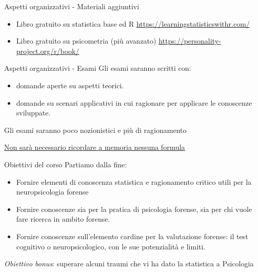 \documentclass[
  ignorenonframetext,
]{beamer}
\providecommand{\tightlist}{%
  \setlength{\itemsep}{0pt}\setlength{\parskip}{0pt}}
\begin{document}
\begin{frame}{Aspetti organizzativi - Materiali aggiuntivi}
\label{aspetti-organizzativi---materiali-aggiuntivi}
\begin{itemize}[<+->]
\item
  Libro gratuito su statistica base ed R
  \url{https://learningstatisticswithr.com/}
\item
  Libro gratuito su psicometria (più avanzato)
  \url{https://personality-project.org/r/book/}
\end{itemize}
\end{frame}

\begin{frame}{Aspetti organizzativi - Esami}
\label{aspetti-organizzativi---esami}
Gli esami saranno scritti con:

\begin{itemize}[<+->]
\tightlist
\item
  domande aperte su aspetti teorici.
\item
  domande su scenari applicativi in cui ragionare per applicare le
  conoscenze sviluppate.
\end{itemize}

Gli esami saranno poco nozionistici e più di ragionamento

\underline{Non sarà necessario ricordare a memoria nessuna formula}
\end{frame}

\begin{frame}{Obiettivi del corso}
\label{obiettivi-del-corso}
Partiamo dalla fine:

\begin{itemize}[<+->]
\tightlist
\item
  Fornire elementi di conoscenza statistica e ragionamento critico utili
  per la neuropsicologia forense
\item
  Fornire conoscenze sia per la pratica di psicologia forense, sia per
  chi vuole fare ricerca in ambito forense.
\item
  Fornire conoscenze sull'elemento cardine per la valutazione forense:
  il test cognitivo o neuropsicologico, con le sue potenzialità e
  limiti.
\end{itemize}

\emph{Obiettivo bonus}: superare alcuni traumi che vi ha dato la
statistica a Psicologia
\end{frame}
\end{document}
